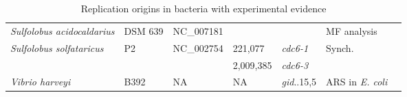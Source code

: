 \begin{table}[ht]
\begin{center}
\begin{tabular}{lllllll}
\textit{Sulfolobus acidocaldarius} & DSM 639 & NC\_007181  &  & & MF analysis& \cite{LundgrenM2004}\\


\textit{Sulfolobus solfataricus} & P2 & NC\_002754 & 221,077 & \textit{cdc6-1}& Synch. & \cite{RobinsonNP2004, LundgrenM2004}\\
 &  &  & 2,009,385 & \textit{cdc6-3}& & \\



\textit{Vibrio harveyi} & B392 & NA & NA & \textit{gid}..15,5& ARS in \textit{E. coli} & \cite{ZyskindJW1983}\\
\hline \hline
\end{tabular}
\caption{Replication origins in bacteria with experimental evidence}
\label{oriexp}
\end{center}
\end{table}
\normalsize